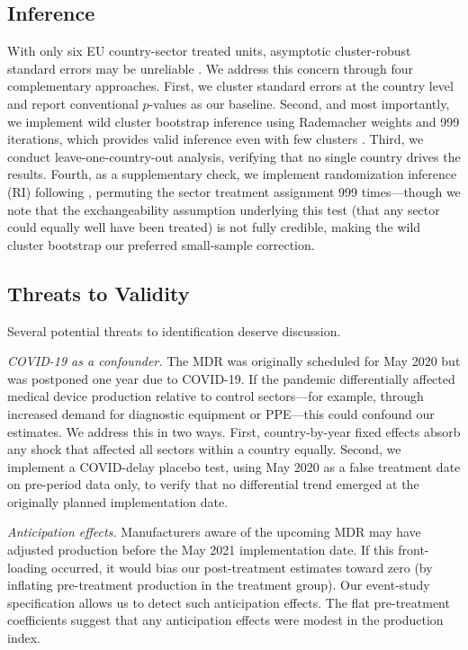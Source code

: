 \documentclass[12pt]{article}
\begin{document}
\subsection{Inference}

With only six EU country-sector treated units, asymptotic cluster-robust standard errors may be unreliable \citep{bertrand2004much}. We address this concern through four complementary approaches. First, we cluster standard errors at the country level and report conventional $p$-values as our baseline. Second, and most importantly, we implement wild cluster bootstrap inference using Rademacher weights and 999 iterations, which provides valid inference even with few clusters \citep{cameron2008bootstrap}. Third, we conduct leave-one-country-out analysis, verifying that no single country drives the results. Fourth, as a supplementary check, we implement randomization inference (RI) following \citet{fisher1935design}, permuting the sector treatment assignment 999 times---though we note that the exchangeability assumption underlying this test (that any sector could equally well have been treated) is not fully credible, making the wild cluster bootstrap our preferred small-sample correction.

\subsection{Threats to Validity}

Several potential threats to identification deserve discussion.

\textit{COVID-19 as a confounder.} The MDR was originally scheduled for May 2020 but was postponed one year due to COVID-19. If the pandemic differentially affected medical device production relative to control sectors---for example, through increased demand for diagnostic equipment or PPE---this could confound our estimates. We address this in two ways. First, country-by-year fixed effects absorb any shock that affected all sectors within a country equally. Second, we implement a COVID-delay placebo test, using May 2020 as a false treatment date on pre-period data only, to verify that no differential trend emerged at the originally planned implementation date.

\textit{Anticipation effects.} Manufacturers aware of the upcoming MDR may have adjusted production before the May 2021 implementation date. If this front-loading occurred, it would bias our post-treatment estimates toward zero (by inflating pre-treatment production in the treatment group). Our event-study specification allows us to detect such anticipation effects. The flat pre-treatment coefficients suggest that any anticipation effects were modest in the production index.
\end{document}
